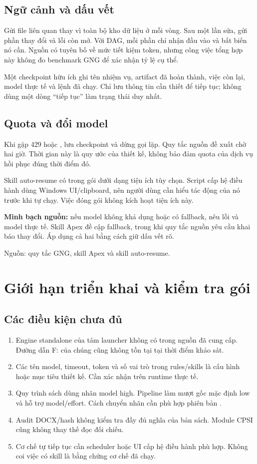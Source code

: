 \documentclass[11pt,a4paper]{article}
\newcommand{\srcref}[1]{\par{\small\color{muted}Nguồn: #1.}\par}
\newcommand{\keypoint}[1]{\par\smallskip\noindent\colorbox{pale}{\parbox{\dimexpr\linewidth-2\fboxsep\relax}{\color{forest}#1}}\par\smallskip}
\newcommand{\code}[1]{\texttt{\detokenize{#1}}}
\begin{document}
\subsection{Ngữ cảnh và dấu vết}
Gửi file liên quan thay vì toàn bộ kho dữ liệu ở mỗi vòng. Sau một lần sửa, gửi phần thay đổi và lỗi còn mở. Với DAG, mỗi phần chỉ nhận đầu vào và bất biến nó cần. Nguồn có tuyên bố về mức tiết kiệm token, nhưng công việc tổng hợp này không đo benchmark GNG để xác nhận tỷ lệ cụ thể.

Một checkpoint hữu ích ghi tên nhiệm vụ, artifact đã hoàn thành, việc còn lại, model thực tế và lệnh đã chạy. Chỉ lưu thông tin cần thiết để tiếp tục; không dùng một dòng ``tiếp tục'' làm trạng thái duy nhất.

\subsection{Quota và đổi model}
Khi gặp 429 hoặc \code{ResourceExhausted}, lưu checkpoint và dừng gọi lặp. Quy tắc nguồn đề xuất chờ hai giờ. Thời gian này là quy ước của thiết kế, không bảo đảm quota của dịch vụ hồi phục đúng thời điểm đó.

Skill auto-resume có trong gói dưới dạng tiện ích tùy chọn. Script cấp hệ điều hành dùng Windows UI/clipboard, nên người dùng cần hiểu tác động của nó trước khi tự chạy. Việc đóng gói không kích hoạt tiện ích này.

\keypoint{\textbf{Minh bạch nguồn:} nếu model không khả dụng hoặc có fallback, nêu lỗi và model thực tế. Skill Apex đề cập fallback, trong khi quy tắc nguồn yêu cầu khai báo thay đổi. Áp dụng cả hai bằng cách giữ dấu vết rõ.}
\srcref{quy tắc GNG, skill Apex và skill auto-resume}
\newpage

\section{Giới hạn triển khai và kiểm tra gói}
\subsection{Các điều kiện chưa đủ}
\begin{enumerate}
\item Engine standalone của tám launcher không có trong nguồn đã cung cấp. Đường dẫn F: của chúng cũng không tồn tại tại thời điểm khảo sát.
\item Các tên model, timeout, token và số vai trò trong rules/skills là cấu hình hoặc mục tiêu thiết kế. Cần xác nhận trên runtime thực tế.
\item Quy trình sách dùng nhãn model high. Pipeline làm mượt gốc mặc định low và hỗ trợ model/effort. Cách chuyển nhãn cần phù hợp phiên bản \code{agy}.
\item Audit DOCX/hash không kiểm tra đầy đủ nghĩa của bản sách. Module CPSI cũng không thay thế đọc đối chiếu.
\item Cơ chế tự tiếp tục cần scheduler hoặc UI cấp hệ điều hành phù hợp. Không coi việc có skill là bằng chứng cơ chế đã chạy.
\end{enumerate}
\end{document}
